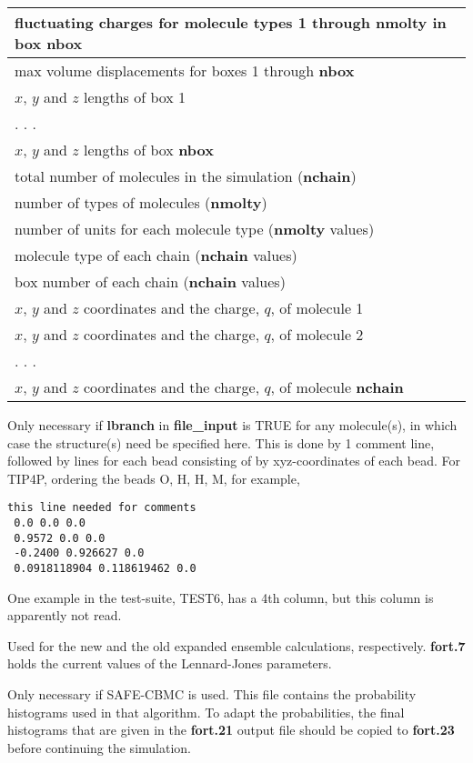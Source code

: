 \documentclass[12pt,letterpaper]{article}
\begin{document}
\begin{center}
\begin{tabular}{| l |}
fluctuating charges for molecule types 1 through {\bf nmolty} in box {\bf nbox} \\ \hline
max volume displacements for boxes 1 through {\bf nbox} \\ \hline
$x$, $y$ and $z$ lengths of box 1  \\ \hline
  . . . \\ \hline
$x$, $y$ and $z$ lengths of box {\bf nbox} \\ \hline
total number of molecules in the simulation ({\bf nchain}) \\ \hline
number of types of molecules ({\bf nmolty}) \\ \hline
number of units for each molecule type ({\bf nmolty} values) \\ \hline
molecule type of each chain ({\bf nchain} values) \\ \hline
box number of each chain ({\bf nchain} values) \\ \hline
$x$, $y$ and $z$ coordinates and the charge, $q$, of molecule 1 \\ \hline
$x$, $y$ and $z$ coordinates and the charge, $q$, of molecule 2 \\ \hline
  . . . \\ \hline
$x$, $y$ and $z$ coordinates and the charge, $q$, of molecule {\bf nchain} \\
  \hline
\end{tabular}
\end{center}

 Only necessary if {\bf lbranch}
in {\bf file\_input} is TRUE for any molecule(s), in which
case the structure(s) need be specified here. This is done
by 1 comment line, followed by lines for each bead consisting 
of by xyz-coordinates of each bead. For TIP4P, ordering the 
beads O, H, H, M, for example, 
\begin{verbatim}
this line needed for comments
 0.0 0.0 0.0
 0.9572 0.0 0.0
 -0.2400 0.926627 0.0
 0.0918118904 0.118619462 0.0
\end{verbatim}
One example in the test-suite, TEST6, has a 4th column, but
this column is apparently not read.


 Used for the new and the old
expanded ensemble calculations, respectively. {\bf fort.7}
holds the current values of the Lennard-Jones parameters.

 Only necessary if SAFE-CBMC is used.
This file contains the probability histograms used in that
algorithm. To adapt the probabilities, the final histograms
that are given in the {\bf fort.21} output file should be
copied to {\bf fort.23} before continuing the simulation.
\end{document}

